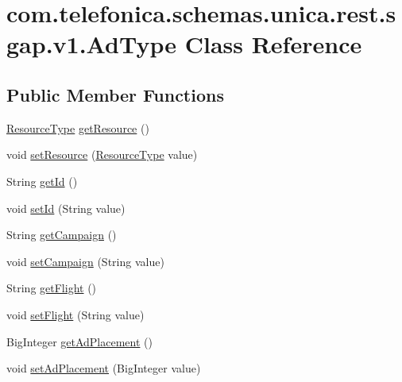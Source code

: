\hypertarget{classcom_1_1telefonica_1_1schemas_1_1unica_1_1rest_1_1sgap_1_1v1_1_1AdType}{
\section{com.telefonica.schemas.unica.rest.sgap.v1.AdType Class Reference}
\label{classcom_1_1telefonica_1_1schemas_1_1unica_1_1rest_1_1sgap_1_1v1_1_1AdType}
}
\subsection*{Public Member Functions}
\begin{DoxyCompactItemize}
\item 
\hyperlink{classcom_1_1telefonica_1_1schemas_1_1unica_1_1rest_1_1sgap_1_1v1_1_1ResourceType}{ResourceType} \hyperlink{classcom_1_1telefonica_1_1schemas_1_1unica_1_1rest_1_1sgap_1_1v1_1_1AdType_a5de59176f34b93d7191818e8dcf31348}{getResource} ()
\item 
void \hyperlink{classcom_1_1telefonica_1_1schemas_1_1unica_1_1rest_1_1sgap_1_1v1_1_1AdType_ab2fee3541b506ec8364da1d213e11d05}{setResource} (\hyperlink{classcom_1_1telefonica_1_1schemas_1_1unica_1_1rest_1_1sgap_1_1v1_1_1ResourceType}{ResourceType} value)
\item 
String \hyperlink{classcom_1_1telefonica_1_1schemas_1_1unica_1_1rest_1_1sgap_1_1v1_1_1AdType_a1f28ea1bf7816f3bca7ebe4c0ac08d3a}{getId} ()
\item 
void \hyperlink{classcom_1_1telefonica_1_1schemas_1_1unica_1_1rest_1_1sgap_1_1v1_1_1AdType_a226953771e9755e3e67a79b8113f4b93}{setId} (String value)
\item 
String \hyperlink{classcom_1_1telefonica_1_1schemas_1_1unica_1_1rest_1_1sgap_1_1v1_1_1AdType_af98fdb4e1606ae6ee83ea823e35219fe}{getCampaign} ()
\item 
void \hyperlink{classcom_1_1telefonica_1_1schemas_1_1unica_1_1rest_1_1sgap_1_1v1_1_1AdType_adac83f347ed558d052538c115e35039e}{setCampaign} (String value)
\item 
String \hyperlink{classcom_1_1telefonica_1_1schemas_1_1unica_1_1rest_1_1sgap_1_1v1_1_1AdType_a91d763253fa8c74563659a5c64980e98}{getFlight} ()
\item 
void \hyperlink{classcom_1_1telefonica_1_1schemas_1_1unica_1_1rest_1_1sgap_1_1v1_1_1AdType_afa7c663694102a5526d121d644f50468}{setFlight} (String value)
\item 
BigInteger \hyperlink{classcom_1_1telefonica_1_1schemas_1_1unica_1_1rest_1_1sgap_1_1v1_1_1AdType_ab9ff06d4d351262457deac87b6ba46c7}{getAdPlacement} ()
\item 
void \hyperlink{classcom_1_1telefonica_1_1schemas_1_1unica_1_1rest_1_1sgap_1_1v1_1_1AdType_a9b57aa612c93e673b937668a98d2ebf4}{setAdPlacement} (BigInteger value)
\end{DoxyCompactItemize}
